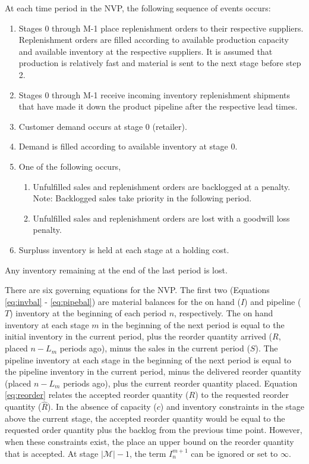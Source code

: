 \documentclass[12pt]{article}
\begin{document}
At each time period in the NVP, the following sequence of events occurs:
\begin{enumerate}
    \item Stages 0 through M-1 place replenishment orders to their respective suppliers. Replenishment orders are filled
        according to available production capacity and available inventory at the respective suppliers. It is assumed that production is relatively fast and material is sent to the next stage before step 2.
    \item Stages 0 through M-1 receive incoming inventory replenishment shipments that have made it down the product pipeline
        after the respective lead times.
    \item Customer demand occurs at stage 0 (retailer).
    \item Demand is filled according to available inventory at stage 0.
    \item One of the following occurs,
        \begin{enumerate}
            \item Unfulfilled sales and replenishment orders are backlogged at a penalty. 
            Note: Backlogged sales take priority in the following period.
            \item Unfulfilled sales and replenishment orders are lost with a goodwill loss penalty.
        \end{enumerate}
    \item Surpluss inventory is held at each stage at a holding cost.
\end{enumerate}

Any inventory remaining at the end of the last period is lost.

There are six governing equations for the NVP. The first two (Equations \ref{eq:invbal} - \ref{eq:pipebal}) are material balances for the on hand ($I$) and pipeline ($T$) inventory at the beginning of each period $n$, respectively. The on hand inventory at each stage $m$ in the beginning of the next period is equal to the initial inventory in the current period, plus the reorder quantity arrived ($R$, placed $n-L_m$ periods ago), minus the sales in the current period ($S$). The pipeline inventory at each stage in the beginning of the next period is equal to the pipeline inventory in the current period, minus the delivered reorder quantity (placed $n-L_m$ periods ago), plus the current reorder quantity placed. Equation \ref{eq:reorder} relates the accepted reorder quantity ($R$) to the requested reorder quantity ($\hat{R}$). In the absence of capacity ($c$) and inventory constraints in the stage above the current stage, the accepted reorder quantity would be equal to the requested order quantity plus the backlog from the previous time point. However, when these constraints exist, the place an upper bound on the reorder quantity that is accepted. At stage $|\mathcal{M}|-1$, the term $I^{m+1}_n$ can be ignored or set to $\infty$. 
\end{document}
